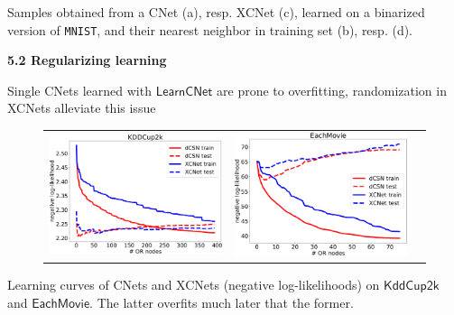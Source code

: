 \documentclass[final]{beamer}
\begin{document}
\begin{frame}{}
\begin{textblock}{17.5}
\begin{figure}[t]
\begin{tabular}{SSSSSXSSSSSXSSSSSXSSSSS}
\end{tabular}

\label{fig:vis}
\end{figure}
\hspace{50pt}
\begin{minipage}{0.8\linewidth}
  \vspace{-20pt}
\scriptsize  Samples obtained from a CNet (a), resp. XCNet (c), learned on 
   a binarized version of \texttt{MNIST}, and their nearest neighbor in training set (b), resp. (d).
 \end{minipage}


 \vspace{20pt}
 {\bf 5.2 Regularizing learning}\par
Single CNets learned with $\mathsf{LearnCNet}$ are prone to overfitting, randomization in
 \textsf{XCNets} alleviate this issue
    
\begin{figure}[t]
  \label{fig:ll}
  \centering
  \begin{tabular}{ccc}
    \includegraphics[width=0.48\linewidth]{figures/kdd-crop} &
    \includegraphics[width=0.48\linewidth]{figures/tmovie-crop}
  \end{tabular}
\end{figure}
\hspace{50pt}
\begin{minipage}{0.8\linewidth}
  \vspace{-10pt}
\scriptsize  Learning curves of CNets and XCNets (negative
log-likelihoods) on $\mathsf{KddCup2k}$ and $\mathsf{EachMovie}$.
The latter overfits much later that the former.
\end{minipage}




\end{textblock}
\end{frame}
\end{document}
